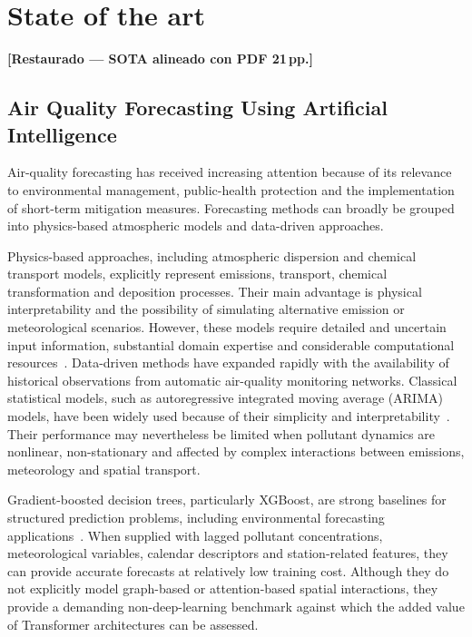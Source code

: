 \documentclass[11pt]{article}
\newenvironment{revnewblock}{%
  \begingroup\color{orange!75!black}%
}{%
  \endgroup%
}
\begin{document}
\section{State of the art}
\label{sec:sota}
\begin{revnewblock}
\noindent\textbf{[Restaurado --- SOTA alineado con PDF 21\,pp.]}\par
\subsection{Air Quality Forecasting Using Artificial Intelligence}

Air-quality forecasting has received increasing attention because of its relevance to environmental management, public-health protection and the implementation of short-term mitigation measures. Forecasting methods can broadly be grouped into physics-based atmospheric models and data-driven approaches.

Physics-based approaches, including atmospheric dispersion and chemical transport models, explicitly represent emissions, transport, chemical transformation and deposition processes. Their main advantage is physical interpretability and the possibility of simulating alternative emission or meteorological scenarios. However, these models require detailed and uncertain input information, substantial domain expertise and considerable computational resources~\cite{AQAT}. Data-driven methods have expanded rapidly with the availability of historical observations from automatic air-quality monitoring networks. Classical statistical models, such as autoregressive integrated moving average (ARIMA) models, have been widely used because of their simplicity and interpretability~\cite{Box2015}. Their performance may nevertheless be limited when pollutant dynamics are nonlinear, non-stationary and affected by complex interactions between emissions, meteorology and spatial transport.

Gradient-boosted decision trees, particularly XGBoost, are strong baselines for structured prediction problems, including environmental forecasting applications~\cite{Chen2016XGBoost,Wallek2024,Wang2023XGBoost}. When supplied with lagged pollutant concentrations, meteorological variables, calendar descriptors and station-related features, they can provide accurate forecasts at relatively low training cost. Although they do not explicitly model graph-based or attention-based spatial interactions, they provide a demanding non-deep-learning benchmark against which the added value of Transformer architectures can be assessed.


\end{revnewblock}
\end{document}
